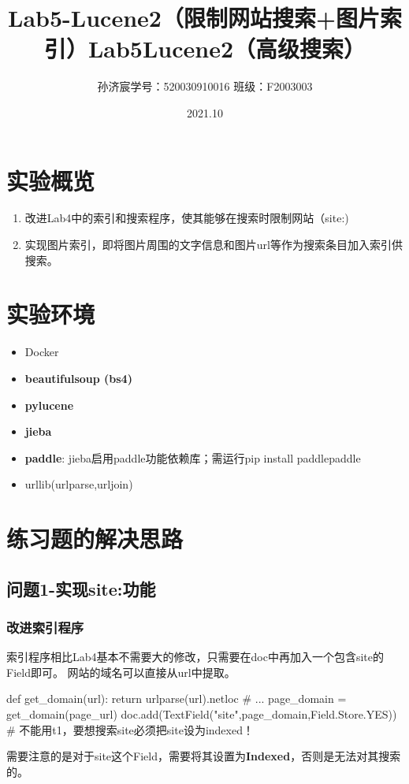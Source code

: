 \documentclass[12pt,a4paper]{article}
\title{Lab5-Lucene2（限制网站搜索+图片索引）}
\title{Lab5\quad Lucene2（高级搜索）}
\date{2021.10}
\author{孙济宸\quad \quad 学号：520030910016 \quad  \quad 班级：F2003003}
\begin{document}
\maketitle
\section{实验概览}
\begin{enumerate}
\item 改进Lab4中的索引和搜索程序，使其能够在搜索时限制网站（site:)
\item 实现图片索引，即将图片周围的文字信息和图片url等作为搜索条目加入索引供搜索。
\end{enumerate}
\section{实验环境}
\begin{itemize}
	\item Docker
	\item \textbf{beautifulsoup (bs4)}
	\item \textbf{pylucene}
	\item \textbf{jieba}
	\item \textbf{paddle}: jieba启用paddle功能依赖库；需运行pip install paddlepaddle
	\item urllib(urlparse,urljoin)

\end{itemize}
\newpage

\section{练习题的解决思路}
\subsection{问题1-实现site:功能}

\subsubsection{改进索引程序}
索引程序相比Lab4基本不需要大的修改，只需要在doc中再加入一个包含site的Field即可。
网站的域名可以直接从url中提取。
\begin{python}
def get_domain(url):
    return urlparse(url).netloc
# ...
page_domain = get_domain(page_url)
doc.add(TextField("site",page_domain,Field.Store.YES)) 
# 不能用t1，要想搜索site必须把site设为indexed！
\end{python}
需要注意的是对于site这个Field，需要将其设置为\textbf{Indexed}，否则是无法对其搜索的。
\end{document}

